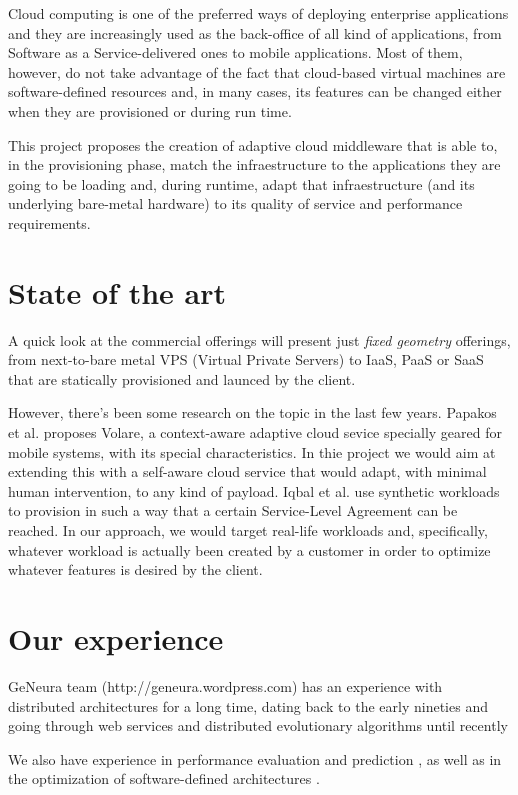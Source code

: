 \documentclass[a4paper]{article}
\begin{document}
Cloud computing is one of the preferred ways of deploying enterprise
applications and they are increasingly used as the back-office of all
kind of applications, from Software as a Service-delivered ones to
mobile applications. Most of them, however, do not take advantage of
the fact that cloud-based virtual machines are software-defined
resources and, in many cases, its features can be changed either when
they are provisioned or during run time.

This project proposes the creation of adaptive cloud middleware that
is able to, in the provisioning phase, match the infraestructure to
the applications they are going to be loading and, during runtime,
adapt that infraestructure (and its underlying bare-metal hardware) to
its quality of service and performance requirements. 

\section{State of the art}

A quick look at the commercial offerings will present just {\em fixed
  geometry} offerings, from next-to-bare metal VPS (Virtual Private
Servers) to IaaS, PaaS or SaaS that are statically provisioned and
launced by the client.

However, there's been some research on the topic in the last few
years. Papakos et al. \cite{Papakos} proposes
Volare, a context-aware adaptive cloud sevice specially geared for
mobile systems, with its special characteristics. In thie project we
would aim at extending this with a self-aware cloud service that would
adapt, with minimal human intervention, to any kind of payload. Iqbal
et al. \cite{Iqbal2011871} use synthetic workloads to provision in
such a way that a certain Service-Level Agreement can be reached. In
our approach, we would target real-life workloads and, specifically,
whatever workload is actually been created by a customer in order to
optimize whatever features is desired by the client.

\section{Our experience}

GeNeura team (http://geneura.wordpress.com) has an experience with
distributed architectures for a long time, dating back to the early
nineties \cite{parallel90} and going through web services and
distributed evolutionary algorithms until recently
\cite{Jini:FEA2000,agajaj,LNCS44480129,Araujo2010}

We also have experience in performance evaluation and prediction
\cite{castillo:evostar08,hardwareevo}, as well as in the optimization of
software-defined architectures \cite{gecco08:castillo}.




\end{document}
